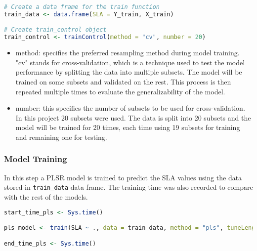 \documentclass[12pt,a4paper]{report}
\begin{document}
\begin{lstlisting}[language=R, style=mystyle]
# Create a data frame for the train function
train_data <- data.frame(SLA = Y_train, X_train)

# Create train_control object
train_control <- trainControl(method = "cv", number = 20)
\end{lstlisting}

\begin{itemize}
    \item method: specifies the preferred resampling method during model training. "cv" stands for cross-validation, which is a technique used to test the model performance by splitting the data into multiple subsets. The model will be trained on some subsets and validated on the rest. This process is then repeated multiple times to evaluate the generalizability of the model.
    \item number: this specifies the number of subsets to be used for cross-validation. In this project 20 subsets were used. The data is split into 20 subsets and the model will be trained for 20 times, each time using 19 subsets for training and remaining one for testing. 
\end{itemize}

\subsubsection*{Model Training}
In this step a PLSR model is trained to predict the SLA values using the data stored in \texttt{train\_data} data frame. The training time was also recorded to compare with the rest of the models. \\

\begin{lstlisting}[language=R, style=mystyle]
start_time_pls <- Sys.time()

pls_model <- train(SLA ~ ., data = train_data, method = "pls", tuneLength = 20, trControl = train_control)

end_time_pls <- Sys.time()
\end{lstlisting}
\end{document}
